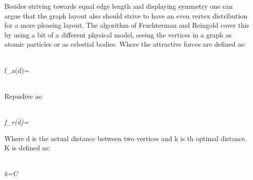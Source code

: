 \documentclass[a4paper,11pt]{kth-mag}
\begin{document}
Besides striving towards equal edge length and displaying symmetry one can argue that the graph layout also should strive to have an even vertex distribution for a more pleasing layout. The algorithm of Fruchterman and Reingold
cover this by using a bit of a different physical model, seeing the vertices in a graph as atomic particles or as celestial bodies. Where the attractive forces are defined as\cite{1338}:\\
\begin{mathsurround}
\\
\math f_{a}(d)=\\
\\
\end{mathsurround}
 Repuslive as:\\
\begin{mathsurround}
\\
\emph{\math f_{r}(d)=}
\\
\end{mathsurround}
Where d is the actual distance between two vertices and k is th optimal distance. K is defined as:\\
\begin{mathsurround}
\\
\emph{\math k=C}
\\
\end{mathsurround}
\end{document}
